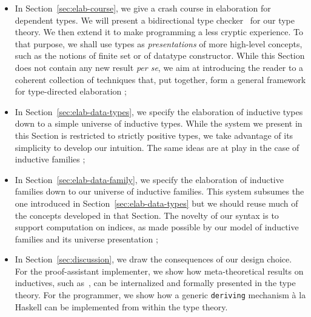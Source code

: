 \documentclass{scrartcl}
\theoremstyle{plain}
\theoremstyle{definition}
\begin{document}
\begin{itemize}



\item In Section~\ref{sec:elab-course}, we give a crash course in
  elaboration for dependent types. We will present a bidirectional
  type checker~\citep{pierce:bidirectional-tc} for our type theory. We
  then extend it to make programming a less cryptic experience. To
  that purpose, we shall use types as \emph{presentations} of more
  high-level concepts, such as the notions of finite set or of
  datatype constructor. While this Section does not contain any new
  result \emph{per se}, we aim at introducing the reader to a coherent
  collection of techniques that, put together, form a general
  framework for type-directed elaboration ;



\item In Section~\ref{sec:elab-data-types}, we specify the elaboration
  of inductive types down to a simple universe of inductive
  types. While the system we present in this Section is restricted to
  strictly positive types, we take advantage of its simplicity to
  develop our intuition. The same ideas are at play in the case of
  inductive families ;
  



\item In Section~\ref{sec:elab-data-family}, we specify the
  elaboration of inductive families down to our universe of inductive
  families. This system subsumes the one introduced in
  Section~\ref{sec:elab-data-types} but we should reuse much of the
  concepts developed in that Section. The novelty of our syntax is to
  support computation on indices, as made possible by our model of
  inductive families and its universe presentation ;




\item In Section~\ref{sec:discussion}, we draw the consequences of our
  design choice. For the proof-assistant implementer, we show how
  meta-theoretical results on inductives, such
  as~\citet{mcbride:construction-constructor}, can be internalized and
  formally presented in the type theory. For the programmer, we show
  how a generic \texttt{deriving} mechanism \`{a} la Haskell
  can be implemented from within the type theory.

\end{itemize}
\end{document}
